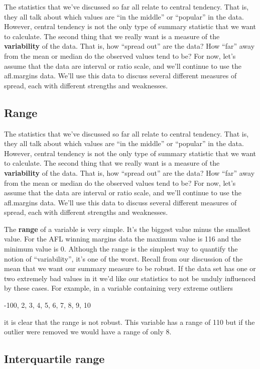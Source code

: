 \documentclass[
]{book}
\begin{document}
The statistics that we've discussed so far all relate to central tendency. That is, they all talk about which values are ``in the middle'' or ``popular'' in the data. However, central tendency is not the only type of summary statistic that we want to calculate. The second thing that we really want is a measure of the \textbf{variability} of the data. That is, how ``spread out'' are the data? How ``far'' away from the mean or median do the observed values tend to be? For now, let's assume that the data are interval or ratio scale, and we'll continue to use the afl.margins data. We'll use this data to discuss several different measures of spread, each with different strengths and weaknesses.

\hypertarget{range}{%
\subsection{Range}\label{range}}

The statistics that we've discussed so far all relate to central tendency. That is, they all talk about which values are ``in the middle'' or ``popular'' in the data. However, central tendency is not the only type of summary statistic that we want to calculate. The second thing that we really want is a measure of the \textbf{variability} of the data. That is, how ``spread out'' are the data? How ``far'' away from the mean or median do the observed values tend to be? For now, let's assume that the data are interval or ratio scale, and we'll continue to use the afl.margins data. We'll use this data to discuss several different measures of spread, each with different strengths and weaknesses.

The \textbf{range} of a variable is very simple. It's the biggest value minus the smallest value. For the AFL winning margins data the maximum value is 116 and the minimum value is 0. Although the range is the simplest way to quantify the notion of ``variability'', it's one of the worst. Recall from our discussion of the mean that we want our summary measure to be robust. If the data set has one or two extremely bad values in it we'd like our statistics to not be unduly influenced by these cases. For example, in a variable containing very extreme outliers

-100, 2, 3, 4, 5, 6, 7, 8, 9, 10

it is clear that the range is not robust. This variable has a range of 110 but if the outlier were removed we would have a range of only 8.

\hypertarget{interquartile-range}{%
\subsection{Interquartile range}\label{interquartile-range}}
\end{document}
